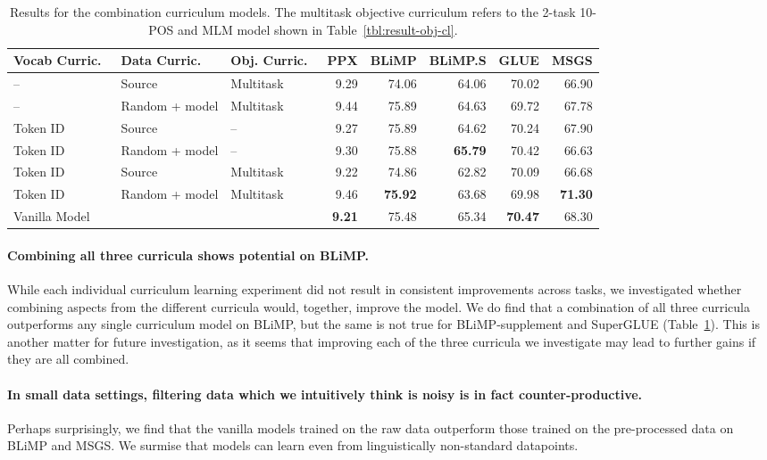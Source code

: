 \begin{table}
    \centering
    \small
    \begin{tabular}{lll|rrrrr}
    \toprule
    Vocab Curric.\ & Data Curric.\ & Obj. Curric.\ & PPX & BLiMP & BLiMP.S & GLUE & MSGS  \\
    \midrule
    -- & Source & Multitask &                           9.29& 74.06 & 64.06 & 70.02 & 66.90 \\
    -- & Random + model & Multitask &                9.44& 75.89 & 64.63 & 69.72 & 67.78 \\
    Token ID & Source & -- &                     
     9.27& 75.89 & 64.62 & 70.24 & 67.90 \\
    Token ID & Random + model & -- &
        9.30& 75.88 & \textbf{65.79} & 70.42 & 66.63 \\
    Token ID & Source & Multitask &
         9.22 & 74.86 & 62.82 & 70.09 & 66.68 \\
    Token ID & Random + model & Multitask & 9.46& \textbf{75.92} & 63.68 & 69.98 & \textbf{71.30} \\
    \midrule
    Vanilla Model & & & \textbf{9.21} & 75.48 & 65.34 & \textbf{70.47} & 68.30 \\
    \bottomrule
    \end{tabular}
    \caption{\label{tbl:result-combination-cl} Results for the combination curriculum models. The multitask objective curriculum refers to the 2-task 10-POS and MLM model shown in Table~\ref{tbl:result-obj-cl}. }
\end{table}

\paragraph{Combining all three curricula shows potential on BLiMP.}
While each individual curriculum learning experiment did not result in consistent improvements across tasks, we investigated whether combining aspects from the different curricula would, together, improve the model.
We do find that a combination of all three curricula outperforms any single curriculum model on BLiMP, but the same is not true for BLiMP-supplement and SuperGLUE (Table~\ref{tbl:result-combination-cl}). This is another matter for future investigation, as it seems that improving each of the three curricula we investigate may lead to further gains if they are all combined.


\paragraph{In small data settings, filtering data which we intuitively think is noisy is in fact counter-productive.} Perhaps surprisingly, we find that the vanilla models trained on the raw data outperform those trained on the pre-processed data on BLiMP and MSGS. We surmise that models can learn even from linguistically non-standard datapoints.

